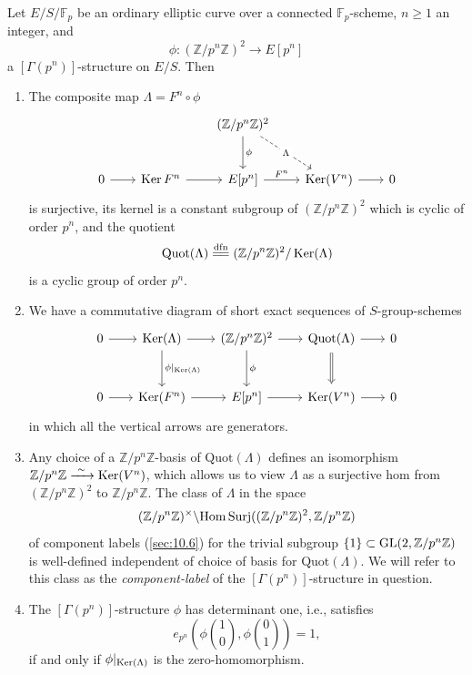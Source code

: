 \begin{kprop}\label{prop:13.7.2}
Let $E/S/\mathbb{F}_p$ be an ordinary elliptic curve over a connected $\mathbb{F}_p$-scheme, $n \ge 1$ an integer, and
\[
\phi : (\mathbb{Z}/p^n\mathbb{Z})^2 \to E[p^n]
\]
a $[\Gamma(p^n)]$-structure on $E/S$. Then
\begin{enumerate}[label=(\arabic*), leftmargin=2.4em]
\item The composite map $\Lambda = F^n \circ \phi$
\[
\begin{tikzcd}[row sep=2.6em, column sep=2.0em]
& & (\mathbb{Z}/p^n\mathbb{Z})^2 \arrow[d, "\phi"] \arrow[rd, dashed, "\Lambda" description] & & \\
0 \arrow[r] & \Ker F^n \arrow[r] & E[p^n] \arrow[r, "F^n"] & \Ker(V^n) \arrow[r] & 0
\end{tikzcd}
\]
is surjective, its kernel is a constant subgroup of $(\mathbb{Z}/p^n\mathbb{Z})^2$ which is cyclic of order $p^n$, and the quotient
\[
\mathrm{Quot}(\Lambda) \xlongequal{\text{dfn}} (\mathbb{Z}/p^n\mathbb{Z})^2/\Ker(\Lambda)
\]
is a cyclic group of order $p^n$.
\item We have a commutative diagram of short exact sequences of $S$-group-schemes
\[
\begin{tikzcd}[row sep=2.9em, column sep=1.9em]
0 \arrow[r] & \Ker(\Lambda) \arrow[r] \arrow[d, "\phi|_{\Ker(\Lambda)}"] & (\mathbb{Z}/p^n\mathbb{Z})^2 \arrow[r] \arrow[d, "\phi"] & \mathrm{Quot}(\Lambda) \arrow[r] \arrow[d, Rightarrow, shorten >=2pt, shorten <=2pt] & 0 \\
0 \arrow[r] & \Ker(F^n) \arrow[r] & E[p^n] \arrow[r] & \Ker(V^n) \arrow[r] & 0
\end{tikzcd}
\]
in which all the vertical arrows are generators.
\item Any choice of a $\mathbb{Z}/p^n\mathbb{Z}$-basis of $\mathrm{Quot}(\Lambda)$ defines an isomorphism $\mathbb{Z}/p^n\mathbb{Z} \xrightarrow{\ \sim\ } \operatorname{Ker}(V^n)$, which allows us to view $\Lambda$ as a surjective hom from $(\mathbb{Z}/p^n\mathbb{Z})^2$ to $\mathbb{Z}/p^n\mathbb{Z}$. The class of $\Lambda$ in the space
\[
(\mathbb{Z}/p^n\mathbb{Z})^\times \backslash \mathrm{Hom\,Surj}((\mathbb{Z}/p^n\mathbb{Z})^2, \mathbb{Z}/p^n\mathbb{Z})
\]
of component labels (\ref{sec:10.6}) for the trivial subgroup $\{1\} \subset \operatorname{GL}(2,\mathbb{Z}/p^n\mathbb{Z})$ is well-defined independent of choice of basis for $\mathrm{Quot}(\Lambda)$. We will refer to this class as the \emph{component-label} of the $[\Gamma(p^n)]$-structure in question.
\item The $[\Gamma(p^n)]$-structure $\phi$ has determinant one, i.e., satisfies
\[
e_{p^n}\!\left(\phi\binom{1}{0}, \phi\binom{0}{1}\right) = 1 ,
\]
if and only if $\phi|_{\operatorname{Ker}(\Lambda)}$ is the zero-homomorphism.
\end{enumerate}
\end{kprop}

